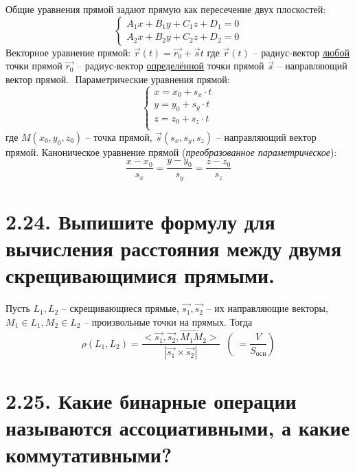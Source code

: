 \documentclass{article}
\begin{document}
Общие уравнения прямой задают прямую как пересечение двух плоскостей:
$$
\begin{cases}
A_1x + B_1y + C_1z + D_1 = 0 \\
A_2x + B_2y + C_2z + D_2 = 0
\end{cases}
$$
Векторное уравнение прямой: $\vec{r}(t) = \vec{r_0} + \vec{s}t$
\newline где $\vec{r}(t)$ -- радиус-вектор \underline{любой} точки прямой
\newline $\vec{r_0}$ -- радиус-вектор \underline{определённой} точки прямой
\newline $\vec{s}$ -- направляющий вектор прямой.
\newline $ $
\newline Параметрические уравнения прямой:
$$
\begin{cases}
x = x_0 + s_x\cdot t \\
y = y_0 + s_y\cdot t \\
z = z_0 + s_z\cdot t \\
\end{cases}
$$
где $M(x_0, y_0, z_0)$ -- точка прямой, $\vec{s}(s_x, s_y, s_z)$ -- направляющий вектор прямой.
\newline Каноническое уравнение прямой (\textit{преобразованное параметрическое}):
$$
\frac{x - x_0}{s_x} = \frac{y - y_0}{s_y} = \frac{z - z_0}{s_z}
$$

\section*{\LARGE 2.24. Выпишите формулу для вычисления расстояния между двумя скрещивающимися прямыми.  }

Пусть $L_1, L_2$ -- скрещивающиеся прямые, $\vec{s_1}, \vec{s_2}$ -- их направляющие векторы, $M_1 \in L_1, M_2 \in L_2$ -- произвольные точки на прямых. Тогда 
$$
\rho(L_1, L_2) = \frac{<\vec{s_1}, \vec{s_2}, \overrightarrow{M_1M_2}>}{|\vec{s_1} \times \vec{s_2}|} \;\; (\;= \frac{V}{S_{\mbox{осн}}})
$$

\section*{\LARGE 2.25. Какие бинарные операции называются ассоциативными, а какие коммутативными?  }
\end{document}
